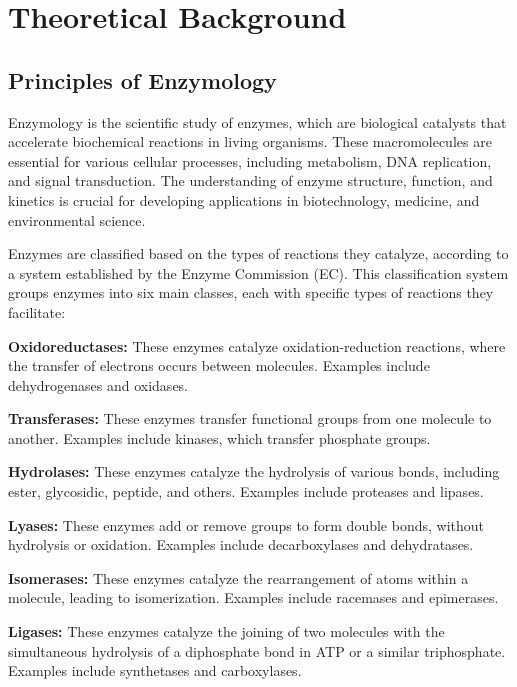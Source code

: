\section{Theoretical Background}

\subsection{Principles of Enzymology}
\label{sec:Principles of Enzymology}

Enzymology is the scientific study of enzymes, which are biological catalysts that accelerate biochemical reactions in living organisms. These macromolecules are essential for various cellular processes, including metabolism, DNA replication, and signal transduction. The understanding of enzyme structure, function, and kinetics is crucial for developing applications in biotechnology, medicine, and environmental science. \autocite{robinsonEnzymesPrinciplesBiotechnological2015}

Enzymes are classified based on the types of reactions they catalyze, according to a system established by the Enzyme Commission (EC). This classification system groups enzymes into six main classes, each with specific types of reactions they facilitate:

\begin{compactenum}
    \item \textbf{Oxidoreductases:} These enzymes catalyze oxidation-reduction reactions, where the transfer of electrons occurs between molecules. Examples include dehydrogenases and oxidases.
    \item \textbf{Transferases:} These enzymes transfer functional groups from one molecule to another. Examples include kinases, which transfer phosphate groups.
    \item \textbf{Hydrolases:} These enzymes catalyze the hydrolysis of various bonds, including ester, glycosidic, peptide, and others. Examples include proteases and lipases.
    \item \textbf{Lyases:} These enzymes add or remove groups to form double bonds, without hydrolysis or oxidation. Examples include decarboxylases and dehydratases.
    \item \textbf{Isomerases:} These enzymes catalyze the rearrangement of atoms within a molecule, leading to isomerization. Examples include racemases and epimerases.
    \item \textbf{Ligases:} These enzymes catalyze the joining of two molecules with the simultaneous hydrolysis of a diphosphate bond in ATP or a similar triphosphate. Examples include synthetases and carboxylases.
    
\end{compactenum}

